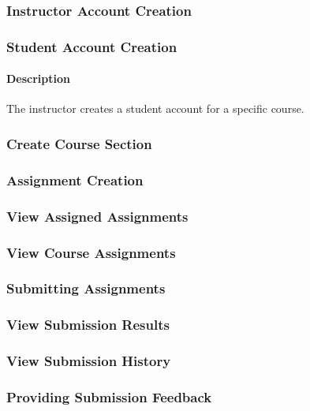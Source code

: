 \documentclass{article}
\begin{document}
\subsubsection{Instructor Account Creation}

\subsubsection{Student Account Creation}

\paragraph{Description} The instructor creates a student account for a specific course.


\subsubsection{Create Course Section}

\subsubsection{Assignment Creation}


\subsubsection{View Assigned Assignments}

\subsubsection{View Course Assignments}


\subsubsection{Submitting Assignments}


\subsubsection{View Submission Results}

\subsubsection{View Submission History}

\subsubsection{Providing Submission Feedback}
\end{document}
